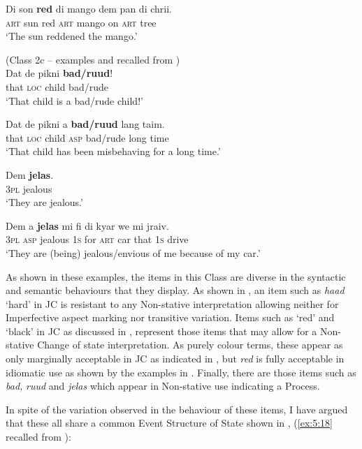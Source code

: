 \ex
\gll  Di son \textbf{red} di mango dem pan di chrii.\\
\textsc{art} sun red \textsc{art} mango {\PL} on \textsc{art} tree\\
\glt `The sun reddened the mango.'
\z
 \z
 
\ea%
\label{ex:6:8}
(Class 2c -- examples  and  recalled from )\\
\ea
\gll Dat de pikni \textbf{bad/ruud}!\\
 that \textsc{loc} child bad/rude\\
\glt `That child is a bad\slash rude child!'

\ex
\gll Dat de pikni a \textbf{bad/ruud} lang taim.\\
 that \textsc{loc} child \textsc{asp} bad/rude long time\\
\glt `That child has been misbehaving for a long time.'
\z
\z 

\ea%
\label{ex:6:9}
\ea
\gll  Dem \textbf{jelas}.\\
 \textsc{3pl} jealous \\
\glt `They are jealous.'

\ex
\gll Dem a \textbf{jelas} mi fi di kyar we mi jraiv.\\ 
 \textsc{3pl} \textsc{asp} jealous \textsc{1s} for \textsc{art} car that \textsc{1s} drive\\
\glt `They are (being) jealous\slash envious of me because of my car.'
\z
\z

As shown in these examples, the items in this Class are diverse in the syntactic and semantic behaviours that they display. As shown in , an item such as \textit{haad} `hard' in JC is resistant to any Non-stative interpretation allowing neither for Imperfective aspect marking nor transitive variation. Items such as ‘red’ and `black' in JC as discussed in , represent those items that may allow for a Non-stative Change of state interpretation. As purely colour terms, these appear as only marginally acceptable in JC as indicated in , but \textit{red} is fully acceptable in idiomatic use as shown by the examples in . Finally, there are those items such as \textit{bad,} \textit{ruud} and \textit{jelas} which appear in Non-stative use indicating a Process. 

In spite of the variation observed in the behaviour of these items, I have argued that these all share a common Event Structure of State shown in , (\ref{ex:5:18} recalled from ): 


